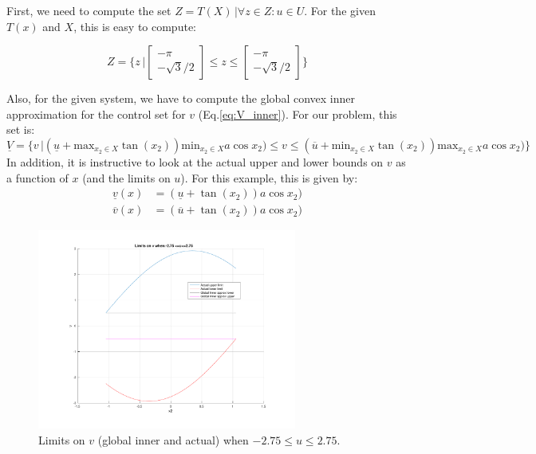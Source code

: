 \documentclass{article}[14pt]
\begin{document}
First, we need to compute the set $Z=T(X)\,|\forall z \in Z: u \in U$. For the given $T(x)$ and $X$, this is easy to compute:

\begin{equation}
Z=\{z\,|\begin{bmatrix} -\pi \\ -\sqrt{3}/2 \end{bmatrix} \leq z \leq \begin{bmatrix} -\pi \\ -\sqrt{3}/2 \end{bmatrix}\}
\end{equation}

Also, for the given system, we have to compute the global convex inner approximation for the control set for $v$ (Eq.\ref{eq:V_inner}). For our problem, this set is:
\begin{equation}
\underline{V}=\{v\,| (\underline{u}+\text{max}_{x_2 \in X}\tan(x_2))\text{min}_{x_2 \in X}a\cos{x_2}) \leq v \leq (\overline{u}+\text{min}_{x_2 \in X}\tan(x_2))\text{max}_{x_2 \in X}a\cos{x_2}) \}
\end{equation}
In addition, it is instructive to look at the actual upper and lower bounds on $v$ as a function of $x$ (and the limits on $u$). For this example, this is given by:
\begin{subequations}
\begin{align}
\underline{v}(x)&=(\underline{u}+\tan(x_2))a\cos{x_2}) \\
\overline{v}(x)&=(\overline{u}+\tan(x_2))a\cos{x_2})
\end{align}
\end{subequations}

\begin{figure}[tb]
	\centering
	\includegraphics[width=0.76\textwidth]{Figs/v_u_275.pdf}
	\vspace{-10pt}
	\caption{Limits on $v$ (global inner and actual) when $-2.75\leq u \leq 2.75$.}
	\label{fig:v_u_275}%
\end{figure} 
\end{document}
